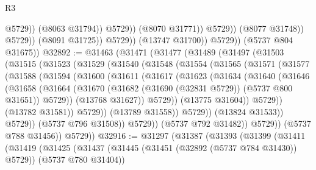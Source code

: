 \begin{lexlean}{R3}
\begin{coremodule}
                                        @5729))
                                    (@8063 @31794))
                                  @5729))
                              (@8070 @31771))
                            @5729))
                        (@8077 @31748))
                      @5729))
                  (@8091 @31725))
                @5729))
            (@13747 @31700))
          @5729))
      (@5737 @804 @31675))
@32892 := @31463
    (@31471
      (@31477
        (@31489
          (@31497
            (@31503
              (@31515
                (@31523
                  (@31529
                    (@31540
                      (@31548
                        (@31554
                          (@31565
                            (@31571
                              (@31577
                                (@31588
                                  (@31594
                                    (@31600
                                      (@31611
                                        (@31617
                                          (@31623
                                            (@31634
                                              (@31640
                                                (@31646
                                                  (@31658
                                                    (@31664
                                                      (@31670
                                                        (@31682
                                                          (@31690 (@32831 @5729))
                                                          (@5737 @800 @31651))
                                                        @5729))
                                                    (@13768 @31627))
                                                  @5729))
                                              (@13775 @31604))
                                            @5729))
                                        (@13782 @31581))
                                      @5729))
                                  (@13789 @31558))
                                @5729))
                            (@13824 @31533))
                          @5729))
                      (@5737 @796 @31508))
                    @5729))
                (@5737 @792 @31482))
              @5729))
          (@5737 @788 @31456))
        @5729))
@32916 := @31297
    (@31387
      (@31393
        (@31399
          (@31411
            (@31419
              (@31425
                (@31437 (@31445 (@31451 (@32892 (@5737 @784 @31430)) @5729)) (@5737 @780 @31404))

\end{coremodule}
\end{lexlean}
